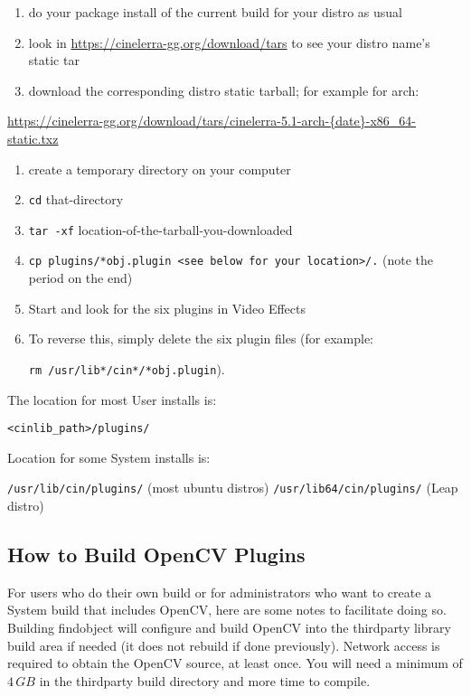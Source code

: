 \begin{enumerate}
    \item do your package install of the current build for your distro as usual
    \item look in {\small \url{https://cinelerra-gg.org/download/tars}} to see your distro name's static tar
    \item download the corresponding distro static tarball;
    for example for arch:
\end{enumerate}

    {\small \url{https://cinelerra-gg.org/download/tars/cinelerra-5.1-arch-{date}-x86_64-static.txz}}

\begin{enumerate}[resume]
    \item create a temporary directory on your computer
    \item \texttt{cd} that-directory
    \item \texttt{tar -xf} location-of-the-tarball-you-downloaded
    \item \texttt{cp plugins/*obj.plugin <see below for your location>/.} (note the period on the end)
    \item Start \CGG{} and look for the six plugins in Video Effects
    \item To reverse this, simply delete the six plugin files (for example:

    \texttt{rm /usr/lib*/cin*/*obj.plugin}).
\end{enumerate}

The location for most User installs is:

\hspace{4em}\texttt{<cinlib\_path>/plugins/}

Location for some System installs is:

\hspace{4em}\texttt{/usr/lib/cin/plugins/} (most ubuntu distros)\newline
\hspace{4em}\texttt{/usr/lib64/cin/plugins/} (Leap distro)

\subsection{How to Build OpenCV Plugins}%
\label{sub:how_build_opencv_plugins}

For users who do their own build or for administrators who want to create a System build that
includes OpenCV, here are some notes to facilitate doing so.  Building findobject will configure
and build OpenCV into the thirdparty library build area if needed (it does not rebuild if done
previously).  Network access is required to obtain the OpenCV source, at least once. You will
need a minimum of $4\, GB$ in the thirdparty build directory and more time to compile.

